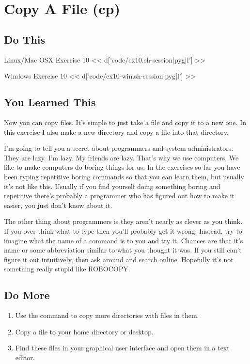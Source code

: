 \chapter{Copy A File (cp)}

\section{Do This}

\begin{code}{Linux/Mac OSX Exercise 10}
<< d['code/ex10.sh-session|pyg|l'] >>
\end{code}

\begin{code}{Windows Exercise 10}
<< d['code/ex10-win.sh-session|pyg|l'] >>
\end{code}

\section{You Learned This}

Now you can copy files.  It's simple to just take a file and copy it to a new
one.  In this exercise I also make a new directory and copy a file into that
directory.

I'm going to tell you a secret about programmers and system administrators.
They are lazy.  I'm lazy.  My friends are lazy.  That's why we use computers.
We like to make computers do boring things for us.  In the exercises so far
you have been typing repetitive boring commands so that you can learn them,
but usually it's not like this.  Usually if you find yourself doing something
boring and repetitive there's probably a programmer who has figured out
how to make it easier, you just don't know about it.

The other thing about programmers is they aren't nearly as clever as you think.
If you over think what to type then you'll probably get it wrong.  Instead, try
to imagine what the name of a command is to you and try it.  Chances are that
it's name or some abbreviation similar to what you thought it was.  If you still can't figure it out intuitively,
then ask around and search online. Hopefully it's not something really stupid like ROBOCOPY.


\section{Do More}

\begin{enumerate}
\item Use the  command to copy more directories with files in them.
\item Copy a file to your home directory or desktop.
\item Find these files in your graphical user interface and open them
    in a text editor.
\end{enumerate}

